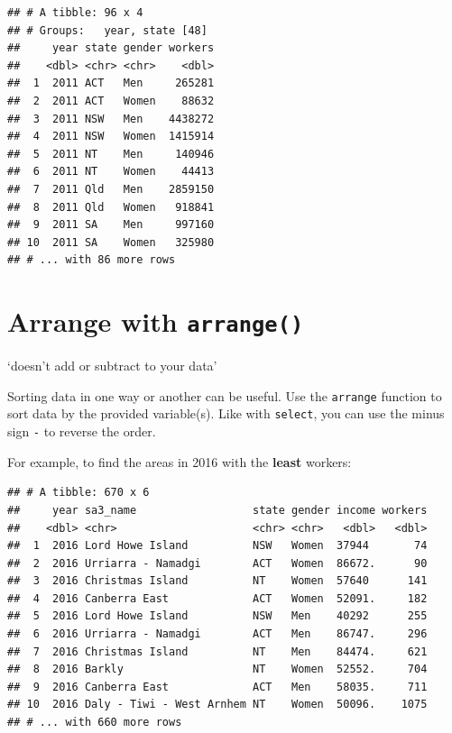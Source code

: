 \documentclass[]{book}
\newenvironment{Shaded}{\begin{snugshade}}{\end{snugshade}}
\newcommand{\DecValTok}[1]{\textcolor[rgb]{0.00,0.00,0.81}{#1}}
\newcommand{\KeywordTok}[1]{\textcolor[rgb]{0.13,0.29,0.53}{\textbf{#1}}}
\newcommand{\NormalTok}[1]{#1}
\newcommand{\OperatorTok}[1]{\textcolor[rgb]{0.81,0.36,0.00}{\textbf{#1}}}
\newcommand{\StringTok}[1]{\textcolor[rgb]{0.31,0.60,0.02}{#1}}
\begin{document}
\begin{verbatim}
## # A tibble: 96 x 4
## # Groups:   year, state [48]
##     year state gender workers
##    <dbl> <chr> <chr>    <dbl>
##  1  2011 ACT   Men     265281
##  2  2011 ACT   Women    88632
##  3  2011 NSW   Men    4438272
##  4  2011 NSW   Women  1415914
##  5  2011 NT    Men     140946
##  6  2011 NT    Women    44413
##  7  2011 Qld   Men    2859150
##  8  2011 Qld   Women   918841
##  9  2011 SA    Men     997160
## 10  2011 SA    Women   325980
## # ... with 86 more rows
\end{verbatim}

\hypertarget{arrange-with-arrange}{%
\section{\texorpdfstring{Arrange with \texttt{arrange()}}{Arrange with arrange()}}\label{arrange-with-arrange}}

`doesn't add or subtract to your data'

Sorting data in one way or another can be useful. Use the \texttt{arrange} function to sort data by the provided variable(s). Like with \texttt{select}, you can use the minus sign \texttt{-} to reverse the order.

For example, to find the areas in 2016 with the \textbf{least} workers:

\begin{Shaded}
\end{Shaded}

\begin{verbatim}
## # A tibble: 670 x 6
##     year sa3_name                  state gender income workers
##    <dbl> <chr>                     <chr> <chr>   <dbl>   <dbl>
##  1  2016 Lord Howe Island          NSW   Women  37944       74
##  2  2016 Urriarra - Namadgi        ACT   Women  86672.      90
##  3  2016 Christmas Island          NT    Women  57640      141
##  4  2016 Canberra East             ACT   Women  52091.     182
##  5  2016 Lord Howe Island          NSW   Men    40292      255
##  6  2016 Urriarra - Namadgi        ACT   Men    86747.     296
##  7  2016 Christmas Island          NT    Men    84474.     621
##  8  2016 Barkly                    NT    Women  52552.     704
##  9  2016 Canberra East             ACT   Men    58035.     711
## 10  2016 Daly - Tiwi - West Arnhem NT    Women  50096.    1075
## # ... with 660 more rows
\end{verbatim}
\end{document}
